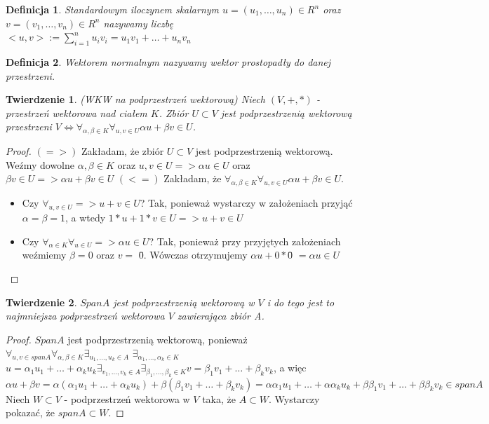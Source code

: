 \documentclass[12pt,a4paper]{article}
\newtheorem{df}{Definicja}[section]
\newtheorem{twr}{Twierdzenie}[section]
\begin{document}
\begin{df}
Standardowym iloczynem skalarnym $u = (u_{1}, \dots, u_{n}) \in R^{n}$ oraz $v = (v_{1}, \dots, v_{n}) \in R^{n}$ nazywamy liczb\k{e} $<u, v> := \sum_{i=1}^{n} u_{i}v_{i} = u_{1}v_{1} + \dots + u_{n}v_{n}$
\end{df}
\begin{df}
Wektorem normalnym nazywamy wektor prostopad{\l}y do danej przestrzeni.
\end{df}
\begin{twr}
(WKW na podprzestrze\'{n} wektorow\k{a}) \newline Niech  $(V, +, *)$ - przestrze\'{n} wektorowa nad cia{\l}em $K$. Zbi\'{o}r $U \subset V$ jest podprzestrzeni\k{a} wektorow\k{a} przestrzeni $V \Leftrightarrow \forall_{\alpha, \beta \in K} \forall_{u, v \in U} \alpha u + \beta v \in U$.
\end{twr}
\begin{proof}
$(=>)$ Zak{\l}adam, \.{z}e zbi\'{o}r $U \subset V$ jest podprzestrzeni\k{a} wektorow\k{a}. We\'{z}my dowolne $\alpha, \beta \in K$ oraz $u, v \in U => \alpha u \in U$ oraz $\beta v \in U => \alpha u + \beta v \in U$
\newline
$(<=)$ Zak{\l}adam, \.{z}e $\forall_{\alpha, \beta \in K} \forall_{u, v \in U} \alpha u + \beta v \in U$.
\begin{itemize}
\item Czy $\forall_{u, v \in U} => u+v \in U$? Tak, poniewa\.{z} wystarczy w za{\l}o\.{z}eniach przyj\k{a}\'{c} $\alpha = \beta = 1$, a wtedy $1*u+1*v \in U => u + v \in U$
\item Czy $\forall_{\alpha \in K} \forall_{u \in U} => \alpha u \in U$? Tak, poniewa\.{z} przy przyj\k{e}tych za{\l}o\.{z}eniach we\'{z}miemy $\beta = 0$ oraz $v =$ \={0}. W\'{o}wczas otrzymujemy $\alpha u + 0 *$\={0} $= \alpha u \in U$
\end{itemize}
\end{proof}

\begin{twr}
$Span A$ jest podprzestrzeni\k{a} wektorow\k{a} w $V$ i do tego jest to najmniejsza podprzestrze\'{n} wektorowa $V$ zawieraj\k{a}ca zbi\'{o}r A.
\end{twr}
\begin{proof}
$Span A$ jest podprzestrzeni\k{a} wektorow\k{a}, poniewa\.{z} \newline $\forall_{u, v \in span A} \forall_{\alpha, \beta \in K} \exists_{u_{1}, \dots, u_{k} \in A}$ $ \exists_{\alpha_{1}, \dots, \alpha_{k} \in K}$ $u = \alpha_{1}u_{1} + \dots + \alpha_{k}u_{k} \exists_{v_{1}, \dots, v_{k} \in A} \exists_{\beta_{1}, \dots, \beta_{k} \in K} v = \beta_{1}v_{1}  + \dots + \beta_{k}v_{k}$, a wi\k{e}c $\alpha u + \beta v = \alpha (\alpha_{1}u_{1} + \dots + \alpha_{k}u_{k}) + \beta (\beta_{1}v_{1} + \dots + \beta_{k}v_{k}) = \alpha \alpha_{1}u_{1}  + \dots + \alpha \alpha_{k}u_{k} + \beta \beta_{1}v_{1} + \dots + \beta \beta_{k}v_{k} \in span A$ \newline
Niech $W \subset V$ - podprzestrze\'{n} wektorowa w $V$ taka, \.{z}e $A \subset W$. Wystarczy pokaza\'{c}, \.{z}e $span A \subset W$.
\end{proof}
\end{document}
